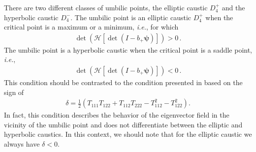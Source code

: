 \documentclass[a4paper, 11pt]{article}
\begin{document}
\bigskip
There are two different classes of umbilic points, the elliptic caustic $D_4^+$ and the hyperbolic caustic $D_4^-$. The umbilic point is an elliptic caustic $D_4^+$ when the critical point is a maximum or a minimum, \textit{i.e.}, for which 
\begin{align}
\det (\mathcal{H}\left[\det (I- b_+ \bm{\psi})\right]) >0\,.
\end{align}
The umbilic point is a hyperbolic caustic when the critical point is a saddle point, \textit{i.e.},
\begin{align}
\det (\mathcal{H}\left[\det (I- b_+ \bm{\psi})\right]) <0\,.
\end{align}
This condition should be contrasted to the condition presented in \cite{Delmarcelle:1995, Lavin:1997, Hidding:2016, Feldbrugge:2018} based on the sign of 
\begin{align}
\delta = \frac{1}{2}(T_{111} T_{122} + T_{112} T_{222} - T_{112}^2  - T_{122}^2 ).
\end{align} 
In fact, this condition describes the behavior of the eigenvector field in the vicinity of the umbilic point and does not differentiate between the elliptic and hyperbolic caustics. In this context, we should note that for the elliptic caustic we always have $\delta <0$.
\end{document}
